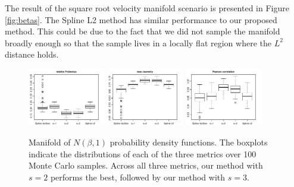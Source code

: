 The result of the square root velocity manifold scenario is presented in
Figure \ref{fig:betas}. The Spline L2 method has similar performance to
our proposed method. This could be due to the fact that we did not
sample the manifold broadly enough so that the sample lives in a locally
flat region where the \(L^2\) distance holds.

\begin{figure}
\centering
\includegraphics[width=0.3\textwidth]{./graphics/sce=2_SNR=high_Kobs=30_MSE}
\includegraphics[width=0.3\textwidth]{./graphics/sce=2_SNR=high_Kobs=30_isometry}
\includegraphics[width=0.3\textwidth]{./graphics/sce=2_SNR=high_Kobs=30_Pearson}
\caption{Manifold of $N(\beta,1)$ probability density functions. The boxplots indicate the distributions of each of the three metrics over 100 Monte Carlo samples. Across all three metrics, our method with $s=2$ performs the best, followed by our method with $s=3$.}
\label{fig:normal}
\end{figure}

